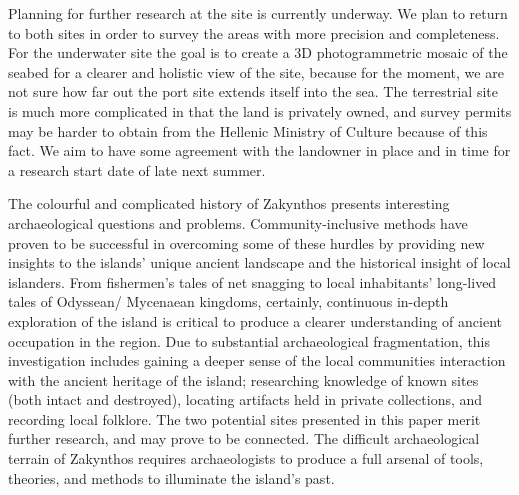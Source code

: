 Planning for further research at the site is currently underway. We plan to return to both sites in order to survey the areas with more precision and completeness. For the underwater site the goal is to create a 3D photogrammetric mosaic of the seabed for a clearer and holistic view of the site, because for the moment, we are not sure how far out the port site extends itself into the sea. The terrestrial site is much more complicated in that the land is privately owned, and survey permits may be harder to obtain from the Hellenic Ministry of Culture because of this fact. We aim to have some agreement with the landowner in place and in time for a research start date of late next summer. 

The colourful and complicated history of Zakynthos presents interesting archaeological questions and problems. Community-inclusive methods have proven to be successful in overcoming some of these hurdles by providing new insights to the islands’ unique ancient landscape and the historical insight of local islanders.  From fishermen’s tales of net snagging to local inhabitants’ long-lived tales of Odyssean/ Mycenaean kingdoms, certainly, continuous in-depth exploration of the island is critical to produce a clearer understanding of ancient occupation in the region. Due to substantial archaeological fragmentation, this investigation includes gaining a deeper sense of the local communities interaction with the ancient heritage of the island; researching knowledge of known sites (both intact and destroyed), locating artifacts held in private collections, and recording local folklore. The two potential sites presented in this paper merit further research, and may prove to be connected. The difficult archaeological terrain of Zakynthos requires archaeologists to produce a full arsenal of tools, theories, and methods to illuminate the island’s past.

